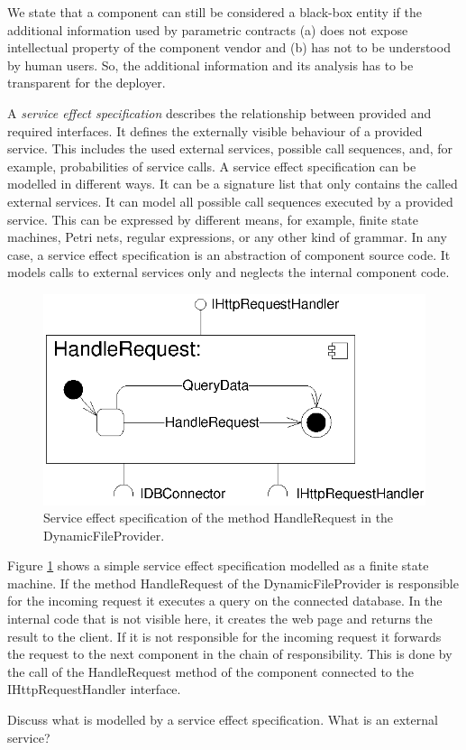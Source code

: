 We state that a component can still be considered a black-box entity if the
additional information used by parametric contracts (a) does not expose
intellectual property of the component vendor and (b) has not to be understood
by human users. So, the additional information and its analysis has to be
transparent for the deployer.

A \emph{service effect specification} describes the relationship between
provided and required interfaces. It defines the externally visible behaviour of
a provided service. This includes the used external services, possible call
sequences, and, for example, probabilities of service calls. A service effect
specification can be modelled in different ways. It can be a signature list that
only contains the called external services. It can model all possible call
sequences executed by a provided service. This can be expressed by different
means, for example, finite state machines, Petri nets, regular expressions, or
any other kind of grammar. In any case, a service effect specification is an
abstraction of component source code. It models calls to external services only
and neglects the internal component code.

\begin{figure}[htbp]
\centering
\includegraphics[scale=0.85]{example/HandleRequestSEFF}
\caption{Service effect specification of the method HandleRequest in the
DynamicFileProvider.}
\label{fig:seff}
\end{figure}

Figure \ref{fig:seff} shows a simple service effect specification modelled as a
finite state machine. If the method HandleRequest of the DynamicFileProvider is
responsible for the incoming request it executes a query on the connected
database. In the internal code that is not visible here, it creates the web page
and returns the result to the client. If it is not responsible for the incoming
request it forwards the request to the next component in the chain of
responsibility. This is done by the call of the HandleRequest method of the
component connected to the IHttpRequestHandler interface.

Discuss what is modelled by a service effect specification. What is an external
service?
